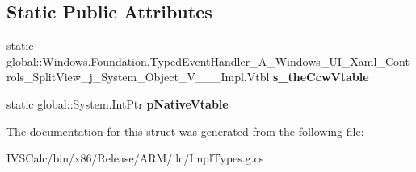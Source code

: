 \subsection*{Static Public Attributes}
\begin{DoxyCompactItemize}
\item 
\mbox{\label{struct_windows_1_1_foundation_1_1_typed_event_handler___a___windows___u_i___xaml___controls___spbe6956be4b8dd5e753952ceff0bf2f92_afd69ccdb7355143cb3d7c63ea6b89681}} 
static global\+::\+Windows.\+Foundation.\+Typed\+Event\+Handler\+\_\+\+A\+\_\+\+Windows\+\_\+\+U\+I\+\_\+\+Xaml\+\_\+\+Controls\+\_\+\+Split\+View\+\_\+j\+\_\+\+System\+\_\+\+Object\+\_\+\+V\+\_\+\+\_\+\+\_\+\+Impl.\+Vtbl {\bfseries s\+\_\+the\+Ccw\+Vtable}
\item 
\mbox{\label{struct_windows_1_1_foundation_1_1_typed_event_handler___a___windows___u_i___xaml___controls___spbe6956be4b8dd5e753952ceff0bf2f92_a815d5b51084b1ad7c9aacba3f23eb2f2}} 
static global\+::\+System.\+Int\+Ptr {\bfseries p\+Native\+Vtable}
\end{DoxyCompactItemize}


The documentation for this struct was generated from the following file\+:\begin{DoxyCompactItemize}
\item 
I\+V\+S\+Calc/bin/x86/\+Release/\+A\+R\+M/ilc/Impl\+Types.\+g.\+cs\end{DoxyCompactItemize}
